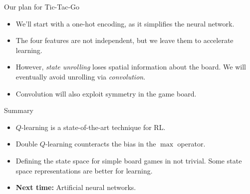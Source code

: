 \documentclass[9pt]{beamer}
\newcommand\lspace{\addtolength{\itemsep}{0.5\baselineskip}}
\begin{document}
\begin{frame}{Our plan for Tic-Tac-Go}

\begin{itemize}\lspace
	\item We'll start with a one-hot encoding, as it simplifies the neural network.
	\item The four features are not independent, but we leave them to accelerate learning.
	\item However, \emph{state unrolling} loses spatial information about the board. We will eventually avoid unrolling via \emph{convolution}.
	\item Convolution will also exploit symmetry in the game board.
\end{itemize}
	
\end{frame}

\begin{frame}{Summary}

\begin{itemize}\lspace
	\item $Q$-learning is a state-of-the-art technique for RL.
	\item Double $Q$-learning counteracts the bias in the $\max$ operator.
	\item Defining the state space for simple board games in not trivial. Some state space representations are better for learning.
	\item<2-> \textbf{Next time:} Artificial neural networks.
\end{itemize}
	
\end{frame}
\end{document}
